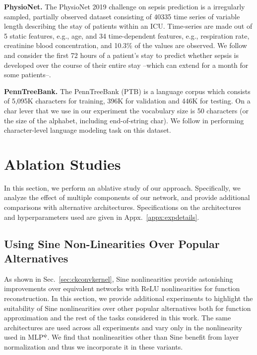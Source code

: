 \documentclass{article}
\newcommand{\mlp}{{\btt MLP}}
\begin{document}
\textbf{PhysioNet.} The PhysioNet 2019 challenge on sepsis prediction \citep{goldberger2000physiobank, reyna2019early} is a irregularly sampled, partially observed dataset consisting of 40335 time series of variable length describing the stay of patients within an ICU. Time-series are made out of 5 static features, e.g., age, and 34 time-dependent features, e.g., respiration rate, creatinine blood concentration, and 10.3\% of the values are observed. We follow \citet{kidger2020neural} and consider the first 72 hours of a patient's stay to predict whether sepsis is developed over the course of their entire stay --which can extend for a month for some patients--. 

\textbf{PennTreeBank.} The PennTreeBank (PTB) \citep{marcinkiewicz1994building} is a language corpus which consists of 5,095K characters for training, 396K for validation and 446K for testing. On a char lever that we use in our experiment the vocabulary size is 50 characters (or the size of the alphabet, including end-of-string char). We follow \cite{bai2018empirical} in performing character-level language modeling task on this dataset.

\section{Ablation Studies}\label{appx:ablation}
In this section, we perform an ablative study of our approach. Specifically, we analyze the effect of multiple components of our network, and provide additional comparisons with alternative architectures. Specifications on the architectures and hyperparameters used are given in Appx.~\ref{appx:expdetails}.

\subsection{Using Sine Non-Linearities Over Popular Alternatives}\label{appx:sinevsothers}
As shown in Sec.~\ref{sec:ckconvkernel}, Sine nonlinearities provide astonishing improvements over equivalent networks with $\mathrm{ReLU}$ nonlinearities for function reconstruction. In this section, we provide additional experiments to highlight the suitability of Sine nonlinearities over other popular alternatives both for function approximation and the rest of the tasks considered in this work. The same architectures are used across all experiments and vary only in the nonlinearity used in \mlp$^{\boldsymbol{\psi}}$. We find that nonlinearities other than $\mathrm{Sine}$ benefit from layer normalization and thus we incorporate it in these variants.
\end{document}
